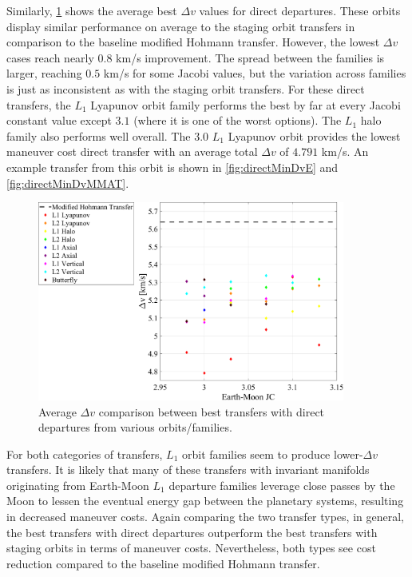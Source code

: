 Similarly, \cref{fig:compareDeltavDirect} shows the average best $\Delta v$ values for direct
departures. These orbits display similar performance on average to the staging orbit transfers in
comparison to the baseline modified Hohmann transfer. However, the lowest $\Delta v$ cases reach
nearly $0.8$ km/s improvement. The spread between the families is larger, reaching $0.5$ km/s for
some Jacobi values, but the variation across families is just as inconsistent as with the staging
orbit transfers. For these direct transfers, the $L_{1}$ Lyapunov orbit family performs the best by
far at every Jacobi constant value except $3.1$ (where it is one of the worst options). The $L_{1}$
halo family also performs well overall. The $3.0$ $L_{1}$ Lyapunov orbit provides the lowest
maneuver cost direct transfer with an average total $\Delta v$ of $4.791$ km/s. An example transfer
from this orbit is shown in \cref{fig:directMinDvE} and \cref{fig:directMinDvMMAT}.

\begin{figure}[!htb]
    \centering
    \includegraphics[width=0.9\textwidth]{figures/DeltavComparisonDirect.pdf}
    \caption{Average $\Delta v$ comparison between best transfers with direct departures from various orbits/families.}
    \label{fig:compareDeltavDirect}
\end{figure}

For both categories of transfers, $L_{1}$ orbit families seem to produce lower-$\Delta v$
transfers. It is likely that many of these transfers with invariant manifolds originating from
Earth-Moon $L_{1}$ departure families leverage close passes by the Moon to lessen the eventual
energy gap between the planetary systems, resulting in decreased maneuver costs. Again comparing
the two transfer types, in general, the best transfers with direct departures outperform the best
transfers with staging orbits in terms of maneuver costs. Nevertheless, both types see cost
reduction compared to the baseline modified Hohmann transfer.

